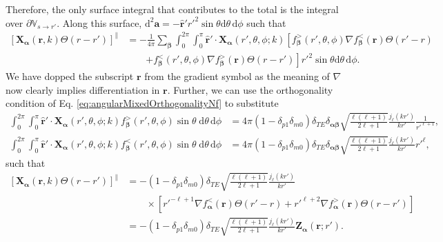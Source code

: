\documentclass{article}
\begin{document}
Therefore, the only surface integral that contributes to the total is the integral over $\partial\mathbb{V}_{s\to r'}$. Along this surface, $\mathrm{d}^2\mathbf{a} = -\hat{\mathbf{r}}'r'^2\sin\theta\mathrm{d}\theta\,\mathrm{d}\phi$ such that
\begin{equation}
\begin{split}
\left[\mathbf{X}_{\bm{\alpha}}(\mathbf{r},k)\Theta(r - r')\right]^\parallel &= 
-\frac{1}{4\pi}\sum_{\bm{\beta}} \int_0^{2\pi}\int_0^\pi\hat{\mathbf{r}}'\cdot\mathbf{X}_{\bm{\alpha}}(r',\theta,\phi;k) \left[f_{\bm{\beta}}^>(r',\theta,\phi)\nabla f_{\bm{\beta}}^<(\mathbf{r})\Theta(r' - r)\right.\\
&\qquad\left.+ f_{\bm{\beta}}^<(r',\theta,\phi)\nabla f_{\bm{\beta}}^>(\mathbf{r})\Theta(r - r')\right]r'^2\sin\theta\mathrm{d}\theta\,\mathrm{d}\phi.
\end{split}
\end{equation}
We have dopped the subscript $\mathbf{r}$ from the gradient symbol as the meaning of $\nabla$ now clearly implies differentiation in $\mathbf{r}$. Further, we can use the orthogonality condition of Eq. \eqref{eq:angularMixedOrthogonalityNf} to substitute
\begin{equation}
\begin{split}
\int_0^{2\pi}\int_0^\pi\hat{\mathbf{r}}'\cdot\mathbf{X}_{\bm{\alpha}}(r',\theta,\phi;k)f_{\bm{\beta}}^>(r',\theta,\phi)\sin\theta\;\mathrm{d}\theta\,\mathrm{d}\phi &= 4\pi(1 - \delta_{p1}\delta_{m0})\delta_{TE}\delta_{\bm{\alpha}\bm{\beta}}\sqrt{\frac{\ell(\ell + 1)}{2\ell + 1}}\frac{j_\ell(kr')}{kr'}\frac{1}{r'^{\ell + 1}},\\
\int_0^{2\pi}\int_0^\pi\hat{\mathbf{r}}'\cdot\mathbf{X}_{\bm{\alpha}}(r',\theta,\phi;k)f_{\bm{\beta}}^<(r',\theta,\phi)\sin\theta\;\mathrm{d}\theta\,\mathrm{d}\phi &= 4\pi(1 - \delta_{p1}\delta_{m0})\delta_{TE}\delta_{\bm{\alpha}\bm{\beta}}\sqrt{\frac{\ell(\ell + 1)}{2\ell + 1}}\frac{j_\ell(kr')}{kr'}r'^\ell,
\end{split}
\end{equation}
such that
\begin{equation}
\begin{split}
\left[\mathbf{X}_{\bm{\alpha}}(\mathbf{r},k)\Theta(r - r')\right]^\parallel &= -(1 - \delta_{p1}\delta_{m0})\delta_{TE}\sqrt{\frac{\ell(\ell + 1)}{2\ell + 1}}\frac{j_\ell(kr')}{kr'}\\
&\qquad\times\left[r'^{-\ell + 1}\nabla f_{\bm{\alpha}}^<(\mathbf{r})\Theta(r' - r) + r'^{\ell + 2}\nabla f_{\bm{\alpha}}^>(\mathbf{r})\Theta(r - r')\right]\\[0.5em]
&= -(1 - \delta_{p1}\delta_{m0})\delta_{TE}\sqrt{\frac{\ell(\ell + 1)}{2\ell + 1}}\frac{j_\ell(kr')}{kr'}\mathbf{Z}_{\bm{\alpha}}(\mathbf{r};r').
\end{split}
\end{equation}
\end{document}
